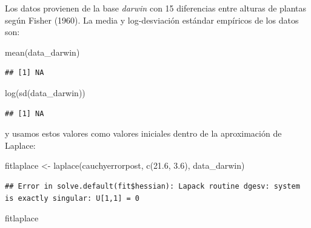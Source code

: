 \documentclass[
  12pt,
]{book}
\newenvironment{Shaded}{\begin{snugshade}}{\end{snugshade}}
\newcommand{\FloatTok}[1]{\textcolor[rgb]{0.00,0.00,0.81}{#1}}
\newcommand{\FunctionTok}[1]{\textcolor[rgb]{0.00,0.00,0.00}{#1}}
\newcommand{\NormalTok}[1]{#1}
\newcommand{\OtherTok}[1]{\textcolor[rgb]{0.56,0.35,0.01}{#1}}
\newcommand{\SpecialCharTok}[1]{\textcolor[rgb]{0.00,0.00,0.00}{#1}}
\theoremstyle{definition}
\theoremstyle{definition}
\theoremstyle{definition}
\theoremstyle{definition}
\theoremstyle{remark}
\begin{document}
Los datos provienen de la base \emph{darwin} con 15 diferencias entre alturas de plantas según Fisher (1960). La media y log-desviación estándar empíricos de los datos son:

\begin{Shaded}
\end{Shaded}

\begin{Shaded}
\begin{Highlighting}[]
\FunctionTok{mean}\NormalTok{(data\_darwin)}
\end{Highlighting}
\end{Shaded}

\begin{verbatim}
## [1] NA
\end{verbatim}

\begin{Shaded}
\begin{Highlighting}[]
\FunctionTok{log}\NormalTok{(}\FunctionTok{sd}\NormalTok{(data\_darwin))}
\end{Highlighting}
\end{Shaded}

\begin{verbatim}
## [1] NA
\end{verbatim}

y usamos estos valores como valores iniciales dentro de la aproximación de Laplace:

\begin{Shaded}
\begin{Highlighting}[]
\NormalTok{fitlaplace }\OtherTok{\textless{}{-}} \FunctionTok{laplace}\NormalTok{(cauchyerrorpost, }\FunctionTok{c}\NormalTok{(}\FloatTok{21.6}\NormalTok{, }\FloatTok{3.6}\NormalTok{),}
\NormalTok{    data\_darwin)}
\end{Highlighting}
\end{Shaded}

\begin{verbatim}
## Error in solve.default(fit$hessian): Lapack routine dgesv: system is exactly singular: U[1,1] = 0
\end{verbatim}

\begin{Shaded}
\begin{Highlighting}[]
\NormalTok{fitlaplace}
\end{Highlighting}
\end{Shaded}
\end{document}
